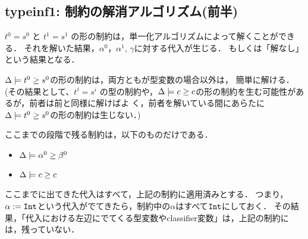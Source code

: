 \subsection{typeinf1: 制約の解消アルゴリズム(前半)}
$t^0=s^0$ と $t^1=s^1$ の形の制約は，単一化アルゴリズムによって解くことができる．
それを解いた結果，$\alpha^0$，$\alpha^1$, $\gamma$に対する代入が生じる．
もしくは「解なし」という結果となる．

$\Delta \models {t^0} \ge {s^0}$の形の制約は，両方ともが型変数の場合以外は，
簡単に解ける．(その結果として、$t^i=s^i$ の型の制約や，$\Delta \models
{c} \ge {c}$の形の制約を生む可能性があるが，前者は前と同様に解けばよ
く，前者を解いている間にあらたに$\Delta \models {t^0} \ge {s^0}$の形の制約は生じない．)

ここまでの段階で残る制約は，以下のものだけである．

\begin{itemize}
\item $\Delta \models {\alpha^0} \ge {\beta^0}$
\item $\Delta \models {c} \ge {c}$
\end{itemize}

ここまでに出てきた代入はすべて，上記の制約に適用済みとする．
つまり，$\alpha:=\mbox{\texttt{Int}}$という代入がでてきたら，制約中の$\alpha$はすべて$\mbox{\texttt{Int}}$にしておく．
その結果，「代入における左辺にでてくる型変数やclassifier変数」は，上記の制約には，残っていない．

